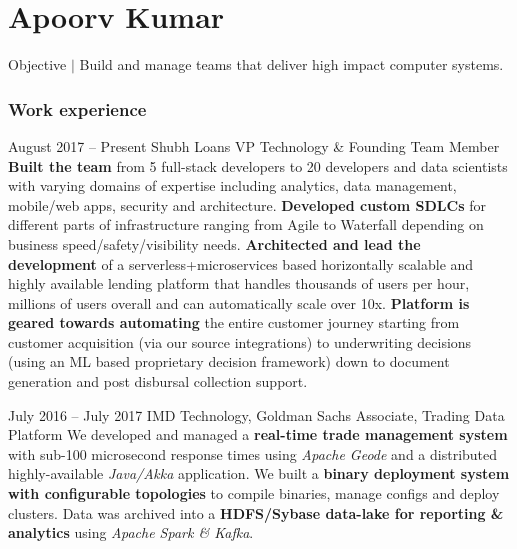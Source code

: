 \documentclass{tccv}
\begin{document}
\part{Apoorv Kumar}
	 {\selectfont\large Objective $\vert$ \selectfont\large Build and manage teams that deliver high impact computer systems.}
     
\section{Work experience}


\begin{eventlist}
\item{August 2017 -- Present}
	 {Shubh Loans}
	 {VP Technology \& Founding Team Member}
\textbf{Built the team} from 5 full-stack developers to 20 developers and data scientists with varying domains of expertise including analytics, data management, mobile/web apps, security and architecture.\newline
\textbf{Developed custom SDLCs} for different parts of infrastructure ranging from Agile to Waterfall depending on business speed/safety/visibility needs.
\textbf{Architected and lead the development} of a serverless+microservices based horizontally scalable and highly available lending platform that handles thousands of users per hour, millions of users overall and can automatically scale over 10x.\newline
\textbf{Platform is geared towards automating} the entire customer journey starting from customer acquisition (via our source integrations) to underwriting decisions (using an ML based proprietary decision framework) down to document generation and post disbursal collection support.\newline


\item{July 2016 -- July 2017}
     {IMD Technology, Goldman Sachs}
     {Associate, Trading Data Platform}
     We developed and managed a \textbf{real-time trade management system} with sub-100 microsecond response times using \textit{Apache Geode} and a distributed highly-available \textit{Java/Akka} application. \newline
     We built a \textbf{binary deployment system with configurable topologies} to compile binaries, manage configs and deploy clusters. Data was archived into a \textbf{HDFS/Sybase data-lake for reporting \& analytics} using \textit{Apache Spark \& Kafka}.



\end{eventlist}
\end{document}
